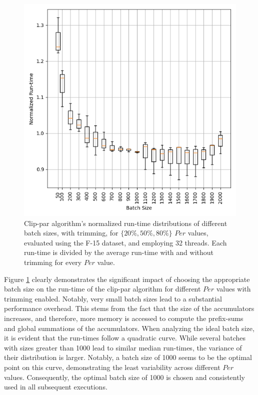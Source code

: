 \documentclass{egpubl}
\begin{document}
\begin{figure}[H]
    \centering
    \includegraphics[width=\linewidth]{./Figures/Batch-Size}
    \caption{Clip-par algorithm's normalized run-time distributions of different batch sizes, with trimming, for  $\{20\%, 50\%, 80\%\}$ $Per$ values, evaluated using the F-15 dataset, and employing 32 threads. Each run-time is divided by the average run-time with and without trimming for every $Per$ value.}
    \label{fig:batch-size}
\end{figure}

Figure \ref{fig:batch-size} clearly demonstrates the significant impact of choosing the appropriate batch size on the run-time of the clip-par algorithm for different $Per$ values with trimming enabled. Notably, very small batch sizes lead to a substantial performance overhead. This stems from the fact that the size of the accumulators increases, and therefore, more memory is accessed to compute the prefix-sums and global summations of the accumulators. When analyzing the ideal batch size, it is evident that the run-times follow a quadratic curve. While several batches with sizes greater than 1000 lead to similar median run-times, the variance of their distribution is larger. Notably, a batch size of 1000 seems to be the optimal point on this curve, demonstrating the least variability across different $Per$ values. Consequently, the optimal batch size of 1000 is chosen and consistently used in all subsequent executions.
\end{document}
